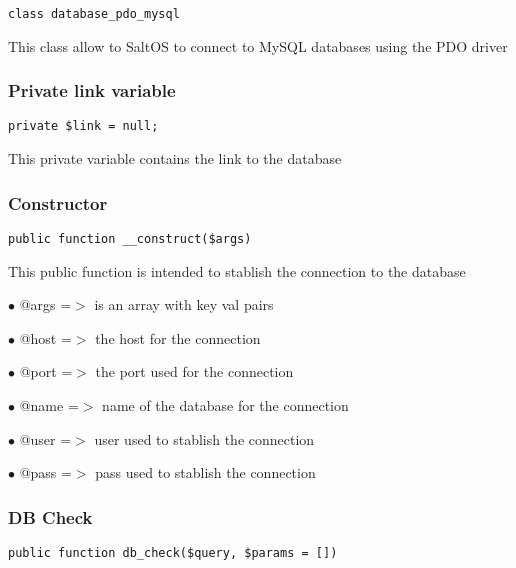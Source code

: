 \documentclass[a4paper]{article}
\begin{document}
\begin{lstlisting}
class database_pdo_mysql
\end{lstlisting}

This class allow to SaltOS to connect to MySQL databases using the PDO driver

\hypertarget{toc337}{}
\subsubsection{Private link variable}

\begin{lstlisting}
private $link = null;
\end{lstlisting}

This private variable contains the link to the database

\hypertarget{toc338}{}
\subsubsection{Constructor}

\begin{lstlisting}
public function __construct($args)
\end{lstlisting}

This public function is intended to stablish the connection to the database

\begin{compactitem}
\item[\color{myblue}$\bullet$] @args =$>$ is an array with key val pairs
\item[\color{myblue}$\bullet$] @host =$>$ the host for the connection
\item[\color{myblue}$\bullet$] @port =$>$ the port used for the connection
\item[\color{myblue}$\bullet$] @name =$>$ name of the database for the connection
\item[\color{myblue}$\bullet$] @user =$>$ user used to stablish the connection
\item[\color{myblue}$\bullet$] @pass =$>$ pass used to stablish the connection
\end{compactitem}

\hypertarget{toc339}{}
\subsubsection{DB Check}

\begin{lstlisting}
public function db_check($query, $params = [])
\end{lstlisting}
\end{document}
